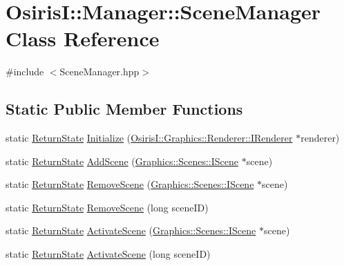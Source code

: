 \hypertarget{class_osiris_i_1_1_manager_1_1_scene_manager}{\section{Osiris\-I\-:\-:Manager\-:\-:Scene\-Manager Class Reference}
\label{class_osiris_i_1_1_manager_1_1_scene_manager}
}


{\ttfamily \#include $<$Scene\-Manager.\-hpp$>$}

\subsection*{Static Public Member Functions}
\begin{DoxyCompactItemize}
\item 
static \hyperlink{namespace_osiris_i_a8f53bf938dc75c65c6a529694514013e}{Return\-State} \hyperlink{class_osiris_i_1_1_manager_1_1_scene_manager_a8b4ac33348afab72167b44dda7011374}{Initialize} (\hyperlink{class_osiris_i_1_1_graphics_1_1_renderer_1_1_i_renderer}{Osiris\-I\-::\-Graphics\-::\-Renderer\-::\-I\-Renderer} $\ast$renderer)
\item 
static \hyperlink{namespace_osiris_i_a8f53bf938dc75c65c6a529694514013e}{Return\-State} \hyperlink{class_osiris_i_1_1_manager_1_1_scene_manager_ac92f8cd592ebbc0bb8bdbdb8cd250dd9}{Add\-Scene} (\hyperlink{class_osiris_i_1_1_graphics_1_1_scenes_1_1_i_scene}{Graphics\-::\-Scenes\-::\-I\-Scene} $\ast$scene)
\item 
static \hyperlink{namespace_osiris_i_a8f53bf938dc75c65c6a529694514013e}{Return\-State} \hyperlink{class_osiris_i_1_1_manager_1_1_scene_manager_a61f8b7bac71fbc370a90ae581dc83cb7}{Remove\-Scene} (\hyperlink{class_osiris_i_1_1_graphics_1_1_scenes_1_1_i_scene}{Graphics\-::\-Scenes\-::\-I\-Scene} $\ast$scene)
\item 
static \hyperlink{namespace_osiris_i_a8f53bf938dc75c65c6a529694514013e}{Return\-State} \hyperlink{class_osiris_i_1_1_manager_1_1_scene_manager_ac47f8c0b4fe2235aab0460f7c35ce9ce}{Remove\-Scene} (long scene\-I\-D)
\item 
static \hyperlink{namespace_osiris_i_a8f53bf938dc75c65c6a529694514013e}{Return\-State} \hyperlink{class_osiris_i_1_1_manager_1_1_scene_manager_a13fdb961e57472a94eb56864fe8dec63}{Activate\-Scene} (\hyperlink{class_osiris_i_1_1_graphics_1_1_scenes_1_1_i_scene}{Graphics\-::\-Scenes\-::\-I\-Scene} $\ast$scene)
\item 
static \hyperlink{namespace_osiris_i_a8f53bf938dc75c65c6a529694514013e}{Return\-State} \hyperlink{class_osiris_i_1_1_manager_1_1_scene_manager_a6bf6599640bd35ef9680a8bf5530139f}{Activate\-Scene} (long scene\-I\-D)

\end{DoxyCompactItemize}
